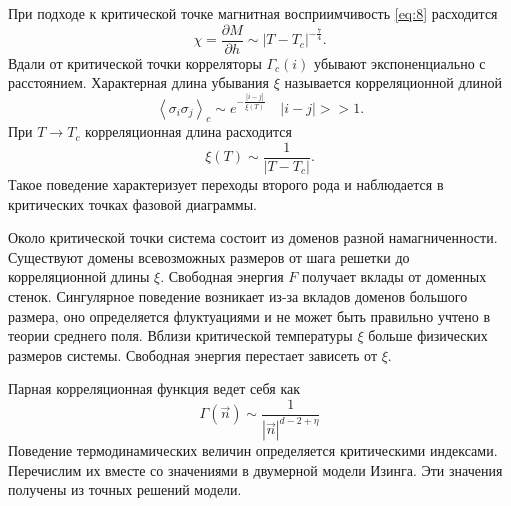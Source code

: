 \documentclass[a4paper,12pt]{article} \usepackage[utf8x]{inputenc} \usepackage[russian]{babel}
\theoremstyle{definition} \newtheorem{corollary}{Corollary}[theorem] \theoremstyle{definition}
\begin{document}
При подходе к критической точке магнитная восприимчивость \eqref{eq:8} расходится
\begin{equation}
  \label{eq:29} \chi=\frac{\partial M}{\partial h}\sim \left|T-T_c \right|^{-\frac{7}{4}}.
\end{equation} Вдали от критической точки корреляторы $\Gamma_c(i)$ убывают экспоненциально с
расстоянием. Характерная длина убывания $\xi$ называется корреляционной длиной
\begin{equation}
  \label{eq:30} \left<\sigma_i\sigma_j\right>_c\sim e^{-\frac{\left|i-j\right|}{\xi(T)}}\quad
\left|i-j\right|>>1.
\end{equation} При $T\to T_c$ корреляционная длина расходится
\begin{equation}
  \label{eq:31} \xi(T)\sim \frac{1}{\left|T-T_c\right|}.
\end{equation} Такое поведение характеризует переходы второго рода и наблюдается в критических
точках фазовой диаграммы.

Около критической точки система состоит из доменов разной намагниченности. Существуют домены
всевозможных размеров от шага решетки до корреляционной длины $\xi$. Свободная энергия $F$ получает
вклады от доменных стенок. Сингулярное поведение возникает из-за вкладов доменов большого размера,
оно определяется флуктуациями и не может быть правильно учтено в теории среднего поля. Вблизи
критической температуры $\xi$ больше физических размеров системы. Свободная энергия перестает
зависеть от $\xi$.

Парная корреляционная функция ведет себя как
\begin{equation}
  \label{eq:32} \Gamma(\vec n)\sim \frac{1}{\left|\vec n\right|^{d-2+\eta}}
\end{equation} Поведение термодинамических величин определяется критическими индексами. Перечислим
их вместе со значениями в двумерной модели Изинга. Эти значения получены из точных решений модели.
\begin{table}[h!tb]
\label{tab:diagrams}
\noindent {}
\end{table}
\end{document}
